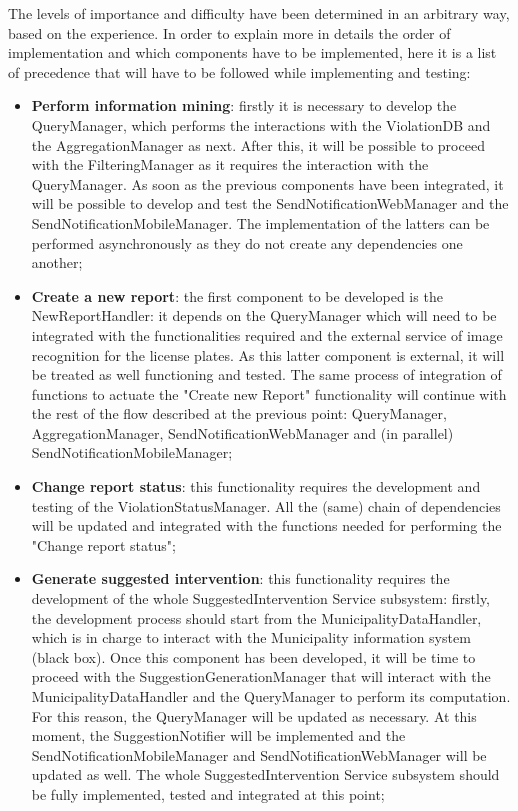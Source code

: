 The levels of importance and difficulty have been determined in an arbitrary way, based on the experience.
In order to explain more in details the order of implementation and which components have to be implemented, here it is a list of precedence that will have to be followed while implementing and testing:
\begin{itemize}
    \item \textbf{Perform information mining}: firstly it is necessary to develop the QueryManager, which performs the interactions with the ViolationDB and the AggregationManager as next. After this, it will be possible to proceed with the FilteringManager as it requires the interaction with the QueryManager. As soon as the previous components have been integrated, it will be possible to develop and test the
     SendNotificationWebManager and the SendNotificationMobileManager. The implementation of the latters can be performed asynchronously as they do not create any dependencies one another; 
    \item \textbf{Create a new report}: the first component to be developed is the NewReportHandler: it depends on the QueryManager which will need to be integrated with the functionalities required and the external service of image recognition for the license plates. As this latter component is external, it will be treated as well functioning and tested. The same process of integration of functions to actuate the "Create new Report" functionality will continue with the rest of the flow described at the previous point: QueryManager, AggregationManager, SendNotificationWebManager and (in parallel) SendNotificationMobileManager;
    \item \textbf{Change report status}: this functionality requires the development and testing of the ViolationStatusManager. All the (same) chain of dependencies will be updated and integrated with the functions needed for performing the "Change report status";
    \item \textbf{Generate suggested intervention}: this functionality requires the development of the whole SuggestedIntervention Service subsystem: firstly, the development process should start from the MunicipalityDataHandler, which is in charge to interact with the Municipality information system (black box). Once this component has been developed, it will be time to proceed with the SuggestionGenerationManager that will interact with the MunicipalityDataHandler and the QueryManager to perform its computation. For this reason, the QueryManager will be updated as necessary. At this moment, the SuggestionNotifier will be implemented and the SendNotificationMobileManager and SendNotificationWebManager will be updated as well. The whole SuggestedIntervention Service subsystem should be fully implemented, tested and integrated at this point;

\end{itemize}
